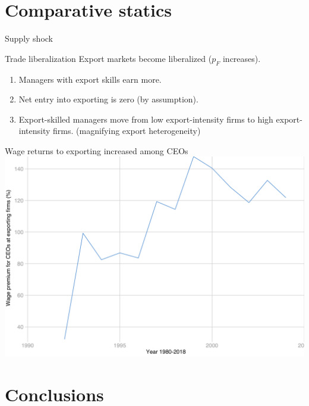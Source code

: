 \documentclass[
  ignorenonframetext,
  aspectratio=43,
]{beamer}
\providecommand{\tightlist}{%
  \setlength{\itemsep}{0pt}\setlength{\parskip}{0pt}}
\begin{document}
\hypertarget{comparative-statics}{%
\section{Comparative statics}\label{comparative-statics}}

\begin{frame}{Supply shock}
\protect\hypertarget{supply-shock}{}
\end{frame}

\begin{frame}{Trade liberalization}
\protect\hypertarget{trade-liberalization}{}
Export markets become liberalized (\(p_F\) increases).

\begin{enumerate}
\tightlist
\item
  Managers with export skills earn more.
\item
  Net entry into exporting is zero (by assumption).
\item
  Export-skilled managers move from low export-intensity firms to high
  export-intensity firms. (magnifying export heterogeneity)
\end{enumerate}
\end{frame}

\begin{frame}{Wage returns to exporting increased among CEOs}
\protect\hypertarget{wage-returns-to-exporting-increased-among-ceos}{}
\includegraphics[width=\textwidth,height=0.7\textheight]{figure/exporter_wage_premium.png}
\end{frame}

\hypertarget{conclusions}{%
\section{Conclusions}\label{conclusions}}
\end{document}
